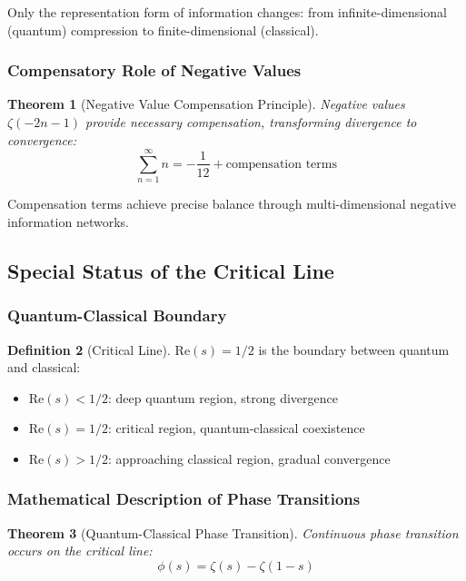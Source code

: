 \documentclass[11pt]{article}
\theoremstyle{plain}
\newtheorem{theorem}{Theorem}[section]
\theoremstyle{definition}
\newtheorem{definition}[theorem]{Definition}
\theoremstyle{remark}
\begin{document}
Only the representation form of information changes: from infinite-dimensional (quantum) compression to finite-dimensional (classical).

\subsubsection{Compensatory Role of Negative Values}

\begin{theorem}[Negative Value Compensation Principle]
Negative values $\zeta(-2n-1)$ provide necessary compensation, transforming divergence to convergence:
$$\sum_{n=1}^{\infty} n = -\frac{1}{12} + \text{compensation terms}$$
\end{theorem}

Compensation terms achieve precise balance through multi-dimensional negative information networks.

\subsection{Special Status of the Critical Line}

\subsubsection{Quantum-Classical Boundary}

\begin{definition}[Critical Line]
$\text{Re}(s) = 1/2$ is the boundary between quantum and classical:
\begin{itemize}
\item $\text{Re}(s) < 1/2$: deep quantum region, strong divergence
\item $\text{Re}(s) = 1/2$: critical region, quantum-classical coexistence
\item $\text{Re}(s) > 1/2$: approaching classical region, gradual convergence
\end{itemize}
\end{definition}

\subsubsection{Mathematical Description of Phase Transitions}

\begin{theorem}[Quantum-Classical Phase Transition]
Continuous phase transition occurs on the critical line:
$$\phi(s) = \zeta(s) - \zeta(1-s)$$
\end{theorem}
\end{document}
